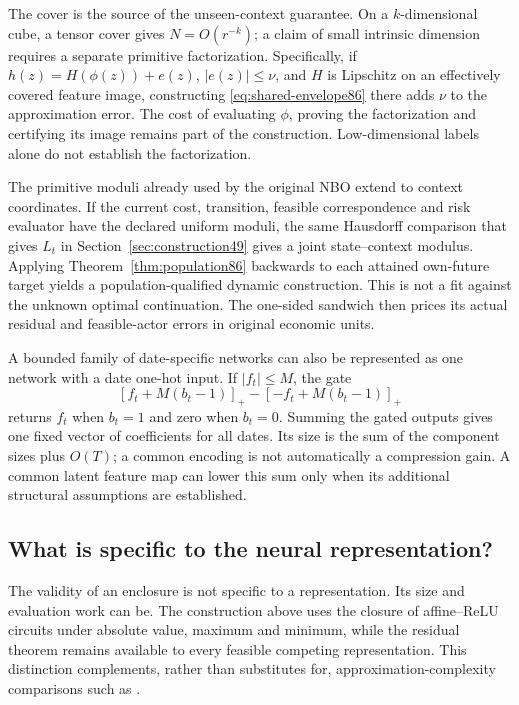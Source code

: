 The cover is the source of the unseen-context guarantee. On a $k$-dimensional cube, a tensor cover gives $N=O(r^{-k})$; a claim of small intrinsic dimension requires a separate primitive factorization. Specifically, if $h(z)=H(\phi(z))+e(z)$, $|e(z)|\le\nu$, and $H$ is Lipschitz on an effectively covered feature image, constructing \eqref{eq:shared-envelope86} there adds $\nu$ to the approximation error. The cost of evaluating $\phi$, proving the factorization and certifying its image remains part of the construction. Low-dimensional labels alone do not establish the factorization.

The primitive moduli already used by the original NBO extend to context coordinates. If the current cost, transition, feasible correspondence and risk evaluator have the declared uniform moduli, the same Hausdorff comparison that gives $L_t$ in Section~\ref{sec:construction49} gives a joint state--context modulus. Applying Theorem~\ref{thm:population86} backwards to each attained own-future target yields a population-qualified dynamic construction. This is not a fit against the unknown optimal continuation. The one-sided sandwich then prices its actual residual and feasible-actor errors in original economic units.

A bounded family of date-specific networks can also be represented as one network with a date one-hot input. If $|f_t|\le M$, the gate
\[
 [f_t+M(b_t-1)]_+-[-f_t+M(b_t-1)]_+
\]
returns $f_t$ when $b_t=1$ and zero when $b_t=0$. Summing the gated outputs gives one fixed vector of coefficients for all dates. Its size is the sum of the component sizes plus $O(T)$; a common encoding is not automatically a compression gain. A common latent feature map can lower this sum only when its additional structural assumptions are established.

\subsection{What is specific to the neural representation?}
The validity of an enclosure is not specific to a representation. Its size and evaluation work can be. The construction above uses the closure of affine--ReLU circuits under absolute value, maximum and minimum, while the residual theorem remains available to every feasible competing representation. This distinction complements, rather than substitutes for, approximation-complexity comparisons such as \citet{yarotsky2017}.

